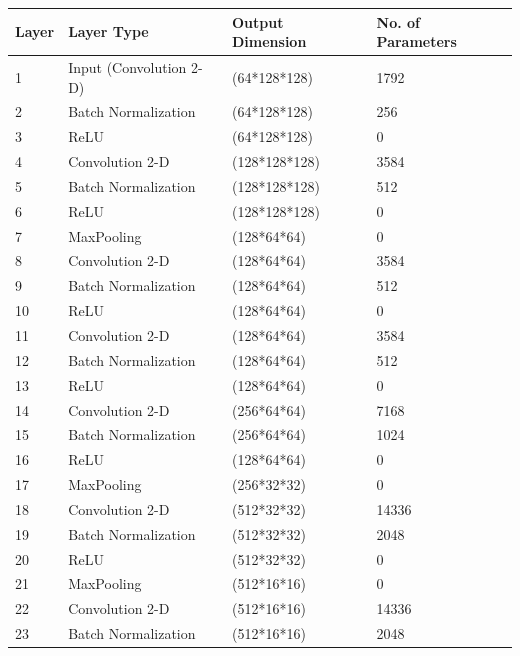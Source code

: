 	\clearpage
	\begin{table}
		\begin{tabular}{|l|l|l|l|}
		\hline
		\textbf{Layer} & \textbf{Layer Type} & \textbf{Output Dimension} & \textbf{No. of Parameters} \\ \hline
		1 & Input (Convolution 2-D) & (64*128*128) & 1792 \\ \hline
		2 & Batch Normalization & (64*128*128) & 256 \\      \hline
		3 & ReLU & (64*128*128) & 0 \\                       \hline
		4 & Convolution 2-D & (128*128*128) & 3584 \\        \hline
		5 & Batch Normalization & (128*128*128) & 512 \\     \hline
		6 & ReLU & (128*128*128) & 0 \\                      \hline
		7 & MaxPooling & (128*64*64) & 0 \\                  \hline
		8 & Convolution 2-D & (128*64*64) & 3584 \\          \hline
		9 & Batch Normalization & (128*64*64) & 512 \\       \hline
		10 & ReLU & (128*64*64) & 0 \\                       \hline
		11 & Convolution 2-D & (128*64*64) & 3584 \\         \hline
		12 & Batch Normalization & (128*64*64) & 512 \\      \hline
		13 & ReLU & (128*64*64) & 0 \\                       \hline
		14 & Convolution 2-D & (256*64*64) & 7168 \\         \hline
		15 & Batch Normalization & (256*64*64) & 1024 \\     \hline
		16 & ReLU & (128*64*64) & 0 \\                       \hline
		17 & MaxPooling & (256*32*32) & 0 \\                 \hline
		18 & Convolution 2-D & (512*32*32) & 14336 \\        \hline
		19 & Batch Normalization & (512*32*32) & 2048 \\     \hline
		20 & ReLU & (512*32*32) & 0 \\                       \hline
		21 & MaxPooling & (512*16*16) & 0 \\                 \hline
		22 & Convolution 2-D & (512*16*16) & 14336 \\        \hline
		23 & Batch Normalization & (512*16*16) & 2048 \\     \hline

\end{tabular}
\end{table}

